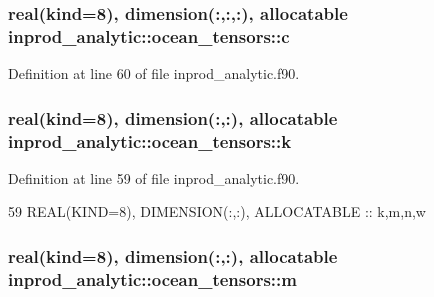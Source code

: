 \subsubsection[{\texorpdfstring{c}{c}}]{\setlength{\rightskip}{0pt plus 5cm}real(kind=8), dimension(\+:,\+:,\+:), allocatable inprod\+\_\+analytic\+::ocean\+\_\+tensors\+::c\hspace{0.3cm}{\ttfamily [private]}}\hypertarget{structinprod__analytic_1_1ocean__tensors_a146670849488f50eff7b1937077a67ff}{}\label{structinprod__analytic_1_1ocean__tensors_a146670849488f50eff7b1937077a67ff}


Definition at line 60 of file inprod\+\_\+analytic.\+f90.

\subsubsection[{\texorpdfstring{k}{k}}]{\setlength{\rightskip}{0pt plus 5cm}real(kind=8), dimension(\+:,\+:), allocatable inprod\+\_\+analytic\+::ocean\+\_\+tensors\+::k\hspace{0.3cm}{\ttfamily [private]}}\hypertarget{structinprod__analytic_1_1ocean__tensors_a1ab0d8f229b274e954a53cc1ce40cac1}{}\label{structinprod__analytic_1_1ocean__tensors_a1ab0d8f229b274e954a53cc1ce40cac1}


Definition at line 59 of file inprod\+\_\+analytic.\+f90.


\begin{DoxyCode}
59      \textcolor{keywordtype}{REAL(KIND=8)}, \textcolor{keywordtype}{DIMENSION(:,:)}, \textcolor{keywordtype}{ALLOCATABLE} :: k,m,n,w
\end{DoxyCode}
\subsubsection[{\texorpdfstring{m}{m}}]{\setlength{\rightskip}{0pt plus 5cm}real(kind=8), dimension(\+:,\+:), allocatable inprod\+\_\+analytic\+::ocean\+\_\+tensors\+::m\hspace{0.3cm}{\ttfamily [private]}}\hypertarget{structinprod__analytic_1_1ocean__tensors_a6f8f8b2b4ef239db0a9f751d7e8452e8}{}\label{structinprod__analytic_1_1ocean__tensors_a6f8f8b2b4ef239db0a9f751d7e8452e8}


